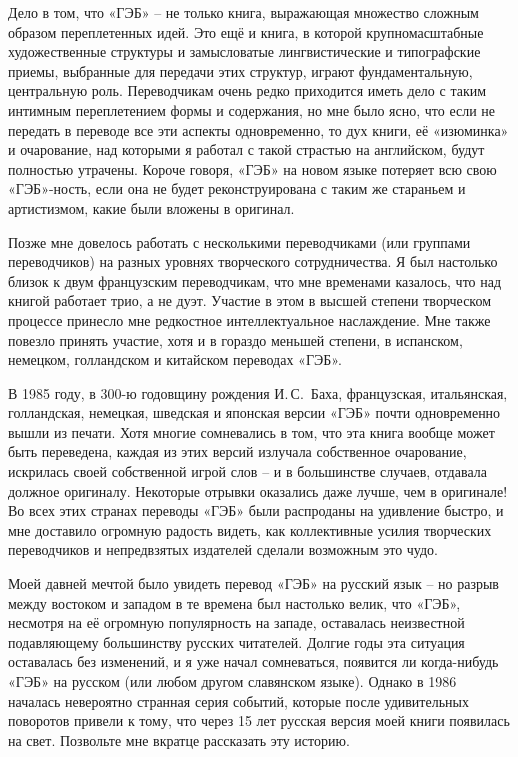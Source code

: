 \documentclass[../main.tex]{subfiles}
\begin{document}
Дело в том, что «ГЭБ» \--- не только книга, выражающая множество сложным образом переплетенных идей. Это ещё и книга, в которой крупномасштабные художественные структуры и замысловатые лингвистические и типографские приемы, выбранные для передачи этих структур, играют фундаментальную, центральную роль. Переводчикам очень редко приходится иметь дело с таким интимным переплетением формы и содержания, но мне было ясно, что если не передать в переводе все эти аспекты одновременно, то дух книги, её «изюминка» и очарование, над которыми я работал с такой страстью на английском, будут полностью утрачены. Короче говоря, «ГЭБ» на новом языке потеряет всю свою «ГЭБ»-ность, если она не будет реконструирована с таким же стараньем и артистизмом, какие были вложены в оригинал.

Позже мне довелось работать с несколькими переводчиками (или группами переводчиков) на разных уровнях творческого сотрудничества. Я был настолько близок к двум французским переводчикам, что мне временами казалось, что над книгой работает трио, а не дуэт. Участие в этом в высшей степени творческом процессе принесло мне редкостное интеллектуальное наслаждение. Мне также повезло принять участие, хотя и в гораздо меньшей степени, в испанском, немецком, голландском и китайском переводах «ГЭБ».

В 1985 году, в 300-ю годовщину рождения И.\,С.~Баха, французская, итальянская, голландская, немецкая, шведская и японская версии «ГЭБ» почти одновременно вышли из печати. Хотя многие сомневались в том, что эта книга вообще может быть переведена, каждая из этих версий излучала собственное очарование, искрилась своей собственной игрой слов \--- и в большинстве случаев, отдавала должное оригиналу. Некоторые отрывки оказались даже лучше, чем в оригинале! Во всех этих странах переводы «ГЭБ» были распроданы на удивление быстро, и мне доставило огромную радость видеть, как коллективные усилия творческих переводчиков и непредвзятых издателей сделали возможным это чудо.

Моей давней мечтой было увидеть перевод «ГЭБ» на русский язык \--- но разрыв между востоком и западом в те времена был настолько велик, что «ГЭБ», несмотря на её огромную популярность на западе, оставалась неизвестной подавляющему большинству русских читателей. Долгие годы эта ситуация оставалась без изменений, и я уже начал сомневаться, появится ли когда-нибудь «ГЭБ» на русском (или любом другом славянском языке). Однако в 1986 началась невероятно странная серия событий, которые после удивительных поворотов привели к тому, что через 15 лет русская версия моей книги появилась на свет. Позвольте мне вкратце рассказать эту историю.
\end{document}
